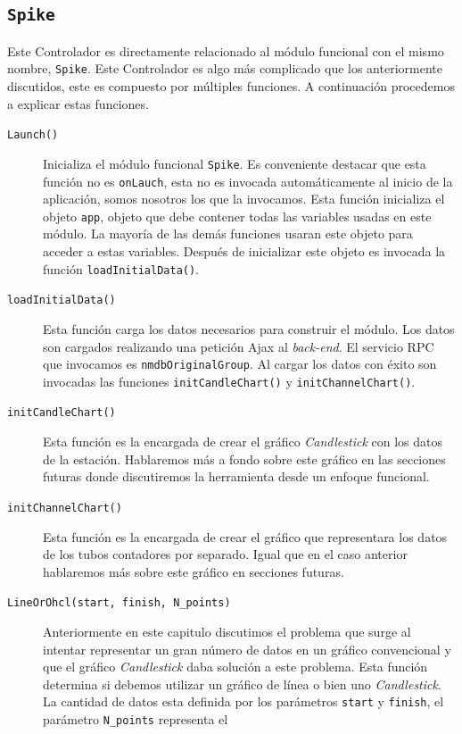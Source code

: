 	\subsection{\texttt{Spike}}
		Este Controlador es directamente relacionado al módulo funcional con el mismo nombre, \texttt{Spike}. Este Controlador es algo más
		complicado que los anteriormente discutidos, este es compuesto por múltiples funciones. A continuación procedemos a explicar estas
		funciones.
		\begin{description}
			\item[\texttt{Launch()}] Inicializa el módulo funcional \texttt{Spike}. Es conveniente destacar que esta función no es
			  \texttt{onLauch}, esta no es invocada automáticamente al inicio de la aplicación, somos nosotros los que la invocamos. Esta
			  función inicializa el objeto \texttt{app}, objeto que debe contener todas las variables usadas en este módulo. La mayoría de
			  las demás funciones usaran este objeto para acceder a estas variables. Después de inicializar este objeto es invocada la
			  función \texttt{loadInitialData()}.
			\item[\texttt{loadInitialData()}] Esta función carga los datos necesarios para construir el módulo. Los datos son cargados
			  realizando una petición Ajax al \emph{back-end}. El servicio RPC que invocamos es \texttt{nmdbOriginalGroup}. Al cargar los
			  datos con éxito son invocadas las funciones \texttt{initCandleChart()} y \texttt{initChannelChart()}. 
			\item[\texttt{initCandleChart()}] Esta función es la encargada de crear el gráfico \emph{Candlestick} con los datos de la
			  estación. Hablaremos más a fondo sobre este gráfico en las secciones futuras donde discutiremos la herramienta desde un
			  enfoque funcional.
			\item[\texttt{initChannelChart()}] Esta función es la encargada de crear el gráfico que representara los datos de los tubos
			  contadores por separado. Igual que en el caso anterior hablaremos más sobre este gráfico en secciones futuras.
			\item[\texttt{LineOrOhcl(start, finish, N\_points)}] Anteriormente en este capitulo discutimos el problema que surge al
			  intentar representar un gran número de datos en un gráfico convencional y que el gráfico \emph{Candlestick} daba solución a
			  este problema. Esta función determina si debemos utilizar un gráfico de línea o bien uno \emph{Candlestick}. La cantidad de
			  datos esta definida por los parámetros \texttt{start} y \texttt{finish}, el parámetro \texttt{N\_points} representa el

\end{description}
